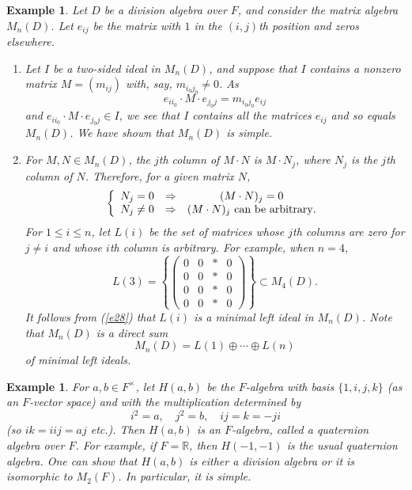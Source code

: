 \documentclass[a4paper,11pt,final,openany]{memoir}%
\newtheorem{example}[X]{Example}
\theoremstyle{nonumberplain}
\begin{document}
\begin{example}
\label{r11}Let $D$ be a division algebra over $F$, and consider the matrix
algebra $M_{n}(D)$. Let $e_{ij}$ be the matrix with $1$ in the $(i,j)$th
position and zeros elsewhere.

\begin{enumerate}
\item Let $I{}$ be a two-sided ideal in $M_{n}(D)$, and suppose that $I{}$
contains a nonzero matrix $M=(m_{ij})$ with, say, $m_{i_{0}j_{0}}\neq0$. As%
\[
e_{ii_{0}}\cdot M\cdot e_{j_{0}j}=m_{i_{0}j_{0}}e_{ij}%
\]
and $e_{ii_{0}}\cdot M\cdot e_{j_{0}j}\in I$, we see that $I{}$ contains all
the matrices $e_{ij}$ and so equals $M_{n}(D)$. We have shown that $M_{n}(D)$
is simple.

\item For $M,N\in M_{n}(D)$, the $j$th column of $M\cdot N$ is $M\cdot N_{j}$,
where $N_{j}$ is the $j$th column of $N$. Therefore, for a given matrix $N$,%
\begin{equation}
\left\{
\begin{array}
[c]{ccc}%
N_{j}=0 & \Rightarrow & (M\cdot N)_{j}=0\\
N_{j}\neq0 & \Rightarrow & (M\cdot N)_{j}\text{ can be arbitrary}.
\end{array}
\right.  \label{e28}%
\end{equation}
For $1\leq i\leq n$, let $L(i)$ be the set of matrices whose $j$th columns are
zero for $j\neq i$ and whose $i$th column is arbitrary. For example, when
$n=4$,%
\[
L(3)=\left\{
\begin{pmatrix}
0 & 0 & \ast & 0\\
0 & 0 & \ast & 0\\
0 & 0 & \ast & 0\\
0 & 0 & \ast & 0
\end{pmatrix}
\right\}  \subset M_{4}(D).
\]
It follows from (\ref{e28}) that $L(i)$ is a minimal left ideal in $M_{n}(D)$.
Note that $M_{n}(D)$ is a direct sum%
\[
M_{n}(D)=L(1)\oplus\cdots\oplus L(n)
\]
of minimal left ideals.
\end{enumerate}
\end{example}

\begin{example}
\label{r13}For $a,b\in F^{\times}$, let $H(a,b)$ be the $F$-algebra with basis
$\{1,i,j,k\}$ (as an $F$-vector space) and with the multiplication determined
by%
\[
i^{2}=a,\quad j^{2}=b,\quad ij=k=-ji
\]
(so $ik=iij=aj$ etc.). Then $H(a,b)$ is an $F$-algebra, called a
\emph{quaternion algebra\/}%
over $F$. For example, if $F=\mathbb{R}$, then $H(-1,-1)$ is the usual
quaternion algebra. One can show that $H(a,b)$ is either a division algebra or
it is isomorphic to $M_{2}(F)$. In particular, it is simple.
\end{example}
\end{document}
